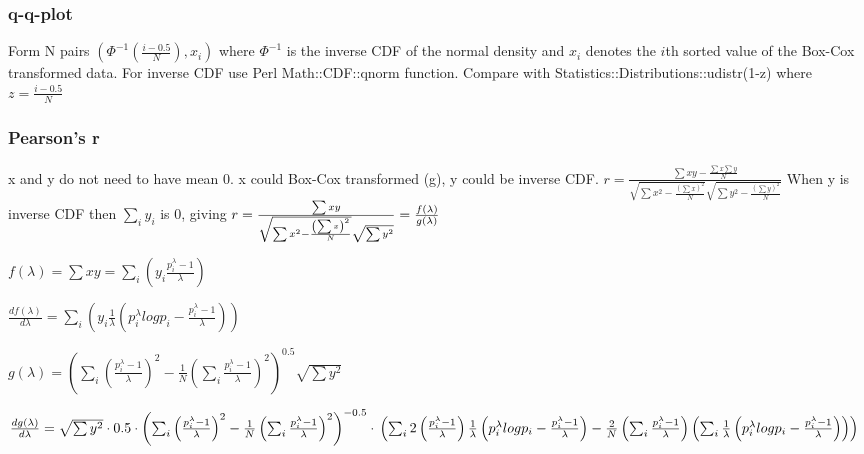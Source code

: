 \subsubsection*{q-q-plot}
Form N pairs
\begin{math}
\left(
\Phi^{-1}\left(\frac{i-0.5}{N}\right), x_i
\right)
\end{math}
where $\Phi^{-1}$ is the inverse CDF of the normal density and $x_i$ denotes the $i$th sorted value
of the Box-Cox transformed data.
For inverse CDF use Perl Math::CDF::qnorm function.
Compare with Statistics::Distributions::udistr(1-z) where $z=\frac{i-0.5}{N}$

\subsubsection*{Pearson's r}
x and y do not need to have mean 0. x could Box-Cox transformed (g), y could be inverse CDF.
\begin{math}
r=\frac{\sum{xy}-\frac{\sum{x}\sum{y}}{N}}
{\sqrt{\sum{x^2}-\frac{\left(\sum{x}\right)^2}{N}}\sqrt{\sum{y^2}-\frac{\left(\sum{y}\right)^2}{N}}}
\end{math}
When y is inverse CDF then $\sum_iy_i$ is 0, giving
\begin{math}
r=\frac{\sum{xy}}
{\sqrt{\sum{x^2}-\frac{\left(\sum{x}\right)^2}{N}}\sqrt{\sum{y^2}}}\\
=\frac{f(\lambda)}{g(\lambda)}
\end{math}

\begin{math}
f(\lambda)=\sum{xy}=\sum_i \left(y_i\frac{p_i^{\lambda}-1}{\lambda}\right)
\end{math}

\begin{math}
\frac{df(\lambda)}{d\lambda}
=\sum_i\left(y_i\frac{1}{\lambda}\left(p_i^{\lambda}log{p_i}-\frac{p_i^{\lambda}-1}{\lambda}\right)\right)
\end{math}


\begin{math}
g(\lambda)=
\left(\sum_i\left(\frac{p_i^{\lambda}-1}{\lambda}\right)^2-\frac{1}{N}\left(\sum_i \frac{p_i^{\lambda}-1}{\lambda}\right)^2  \right)^{0.5}
\sqrt{\sum{y^2}}
\end{math}

\begin{math}
\frac{dg(\lambda)}{d\lambda}=
\sqrt{\sum{y^2}}\cdot
0.5\cdot\left(\sum_i\left(\frac{p_i^{\lambda}-1}{\lambda}\right)^2-\frac{1}{N}\left(\sum_i \frac{p_i^{\lambda}-1}{\lambda}\right)^2  \right)^{-0.5}
\cdot\\
\left(
\sum_i2\left(\frac{p_i^{\lambda}-1}{\lambda} \right)\frac{1}{\lambda}\left(p_i^{\lambda}log{p_i}-\frac{p_i^{\lambda}-1}{\lambda}\right)
-\frac{2}{N}\left(\sum_i \frac{p_i^{\lambda}-1}{\lambda}\right) \left(\sum_i \frac{1}{\lambda}\left(p_i^{\lambda}log{p_i}-\frac{p_i^{\lambda}-1}{\lambda}\right) \right)
\right)
\end{math}

